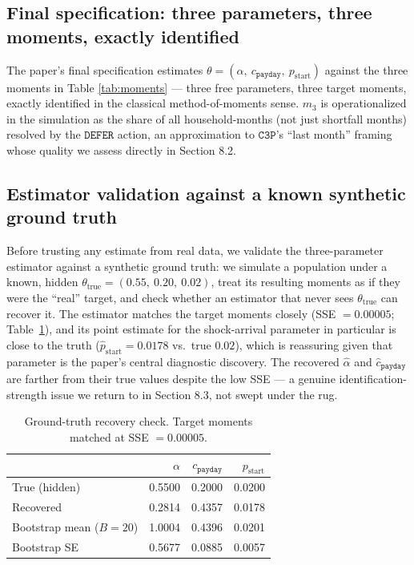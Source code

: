 \documentclass[12pt]{article}
\begin{document}
\subsection{Final specification: three parameters, three moments, exactly identified}

The paper's final specification estimates $\theta = (\alpha,\ c_{\texttt{payday}},\ p_{\text{start}})$ against the three moments in Table \ref{tab:moments} — three free parameters, three target moments, exactly identified in the classical method-of-moments sense. $m_3$ is operationalized in the simulation as the share of all household-months (not just shortfall months) resolved by the $\texttt{DEFER}$ action, an approximation to $\texttt{C3P}$'s ``last month'' framing whose quality we assess directly in Section 8.2.

\subsection{Estimator validation against a known synthetic ground truth}

Before trusting any estimate from real data, we validate the three-parameter estimator against a synthetic ground truth: we simulate a population under a known, hidden $\theta_{\text{true}} = (0.55,\ 0.20,\ 0.02)$, treat its resulting moments as if they were the ``real'' target, and check whether an estimator that never sees $\theta_{\text{true}}$ can recover it. The estimator matches the target moments closely (SSE $= 0.00005$; Table~\ref{tab:validation}), and its point estimate for the shock-arrival parameter in particular is close to the truth ($\hat p_{\text{start}}=0.0178$ vs.\ true $0.02$), which is reassuring given that parameter is the paper's central diagnostic discovery. The recovered $\hat\alpha$ and $\hat c_{\texttt{payday}}$ are farther from their true values despite the low SSE — a genuine identification-strength issue we return to in Section 8.3, not swept under the rug.

\begin{table}[h]
\centering
\begin{tabular}{@{}lrrr@{}}
\toprule
& $\alpha$ & $c_{\texttt{payday}}$ & $p_{\text{start}}$ \\
\midrule
True (hidden) & 0.5500 & 0.2000 & 0.0200 \\
Recovered & 0.2814 & 0.4357 & 0.0178 \\
Bootstrap mean ($B=20$) & 1.0004 & 0.4396 & 0.0201 \\
Bootstrap SE & 0.5677 & 0.0885 & 0.0057 \\
\bottomrule
\end{tabular}
\caption{Ground-truth recovery check. Target moments matched at SSE $=0.00005$.}
\label{tab:validation}
\end{table}
\end{document}
